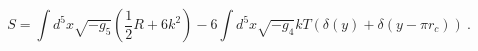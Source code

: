 \begin{equation} \label{lagads}
	S= \int d^5 x \sqrt{-g_5} (\frac{1}{2}R + 6 k^2)-  6 \int d^5 x\sqrt{-g_4}k T (\delta(y) +\delta(y-\pi r_c))\ .
       \end{equation}

